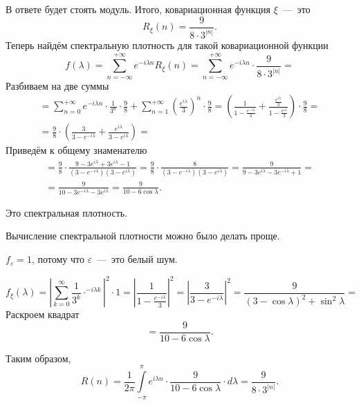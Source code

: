 В ответе будет стоять модуль.
Итого, ковариационная функция $ \xi $~---~это
\begin{equation*}
  R_{ \xi } \left( n \right) =
  \frac{9}{8 \cdot 3^{ \left| n \right| }}.
\end{equation*}
Теперь найдём спектральную плотность для такой ковариационной функции
\begin{equation*}
  f \left( \lambda \right) =
  \sum \limits_{n = -\infty }^{+\infty } e^{-i \lambda n} R_{ \xi } \left( n \right) =
  \sum \limits_{n = -\infty }^{+\infty }
    e^{-i \lambda n} \cdot \frac{9}{8 \cdot 3^{ \left| n \right| }} =
\end{equation*}
Разбиваем на две суммы
\begin{gather*}
  = \sum \limits_{n = 0}^{+\infty } e^{-i \lambda n} \cdot \frac{1}{3^n} \cdot \frac{9}{8} +
  \sum \limits_{n = 1}^{+\infty } \left( \frac{e^{i \lambda }}{3} \right)^n \cdot \frac{9}{8} =
  \left(
    \frac{1}{1 - \frac{e^{-i \lambda }}{3}} +
    \frac{ \frac{e^{i \lambda }}{3}}{1 - \frac{e^{i \lambda }}{3}}
  \right) \cdot \frac{9}{8} = \\
  = \frac{9}{8} \cdot
  \left( \frac{3}{3 - e^{-i \lambda }} + \frac{e^{i \lambda }}{3 - e^{i \lambda }} \right) =
\end{gather*}
Приведём к общему знаменателю
\begin{gather*}
  = \frac{9}{8} \cdot
  \frac{9 - 3e^{i \lambda } + 3e^{i \lambda } - 1}{ \left( 3 - e^{-i \lambda } \right) \left( 3 - e^{i \lambda } \right) } =
  \frac{9}{8} \cdot
  \frac{8}{ \left( 3 - e^{-i \lambda } \right) \left( 3 - e^{i \lambda } \right) } =
  \frac{9}{9 - 3e^{i \lambda } - 3e^{-i \lambda } + 1} = \\
  = \frac{9}{10 - 3e^{-i \lambda } - 3e^{i \lambda }} =
  \frac{9}{10 - 6 \cos \lambda }.
\end{gather*}

Это спектральная плотность.

Вычисление спектральной плотности можно было делать проще.

$f_{ \varepsilon } = 1$, потому что $ \varepsilon $~---~это белый шум.

\begin{equation*}
  f_{ \xi } \left( \lambda \right) =
  \left| \sum \limits_{k = 0}^{ \infty } \frac{1}{3^k} \cdot ^{-i \lambda k} \right|^2 \cdot 1 =
  \left| \frac{1}{1 - \frac{e^{-i \lambda }}{3}} \right|^2 =
  \left| \frac{3}{3 - e^{-i \lambda }} \right|^2 =
  \frac{9}{ \left( 3 - \cos \lambda \right)^2 + \sin^2 \lambda } =
\end{equation*}
Раскроем квадрат
\begin{equation*}
  = \frac{9}{10 - 6 \cos \lambda }.
\end{equation*}

Таким образом,
\begin{equation*}
  R \left( n \right) =
  \frac{1}{2 \pi }
  \int \limits_{-\pi }^{ \pi } e^{i \lambda n} \cdot \frac{9}{10 - 6 \cos \lambda} \cdot d \lambda =
  \frac{9}{8 \cdot 3^{ \left| n \right| }}.
\end{equation*}
